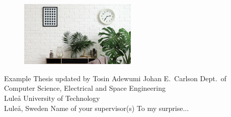 \documentclass[12pt,a4paper,openright,final,twoside]{cseethesis}
\begin{document}
\def\thesistitle{Example Thesis updated by Tosin Adewumi}

\begin{figure}[h]
 \centering
 \includegraphics[width=0.5\textwidth]{bg_wall.jpg}
\end{figure}

\def\theauthor{Johan E.\ Carlson}
\def\theaddress{Dept.\ of Computer Science, Electrical and Space Engineering\\
Lule{\aa} University of Technology\\ Lule{\aa}, Sweden}

\def\supervisors{Name of your supervisor(s)}
\def\supervisorstring{Supervisors:} %
\def\dedication{To my surprise...}

\def\theabstract{}
\def\thepreface{}



\def\thelogo{} %


\startpreamble
  {\thesistitle}
  {\theauthor}
  {\theaddress}
  {\supervisors}
  {\dedication}
  {\theabstract}
  {\thepreface}
  {\thelogo}
\end{document}
